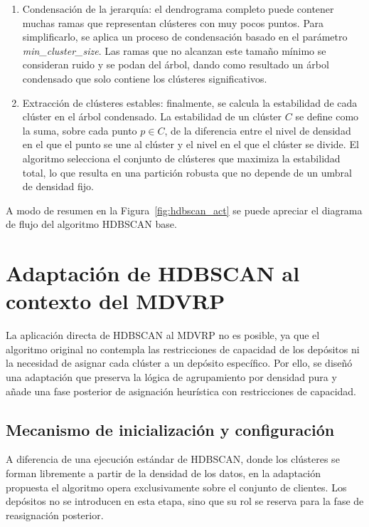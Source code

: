 \begin{enumerate}
\item Condensación de la jerarquía: el dendrograma completo puede contener muchas ramas que representan clústeres con muy pocos puntos. Para simplificarlo, se aplica un proceso de condensación basado en el parámetro \textit{min\_cluster\_size}. Las ramas que no alcanzan este tamaño mínimo se consideran ruido y se podan del árbol, dando como resultado un árbol condensado que solo contiene los clústeres significativos.

\item Extracción de clústeres estables: finalmente, se calcula la estabilidad de cada clúster en el árbol condensado. La estabilidad de un clúster \(C\) se define como la suma, sobre cada punto \(p \in C\), de la diferencia entre el nivel de densidad en el que el punto se une al clúster y el nivel en el que el clúster se divide. El algoritmo selecciona el conjunto de clústeres que maximiza la estabilidad total, lo que resulta en una partición robusta que no depende de un umbral de densidad fijo.
\end{enumerate}

A modo de resumen en la Figura~\ref{fig:hdbscan_act} se puede apreciar el diagrama de flujo del algoritmo HDBSCAN base.


\section{Adaptación de HDBSCAN al contexto del MDVRP}

La aplicación directa de HDBSCAN al MDVRP no es posible, ya que el algoritmo original no contempla las restricciones de capacidad de los depósitos ni la necesidad de asignar cada clúster a un depósito específico. Por ello, se diseñó una adaptación que preserva la lógica de agrupamiento por densidad pura y añade una fase posterior de asignación heurística con restricciones de capacidad.

\subsection{Mecanismo de inicialización y configuración}

A diferencia de una ejecución estándar de HDBSCAN, donde los clústeres se forman libremente a partir de la densidad de los datos, en la adaptación propuesta el algoritmo opera exclusivamente sobre el conjunto de clientes. Los depósitos no se introducen en esta etapa, sino que su rol se reserva para la fase de reasignación posterior. 

